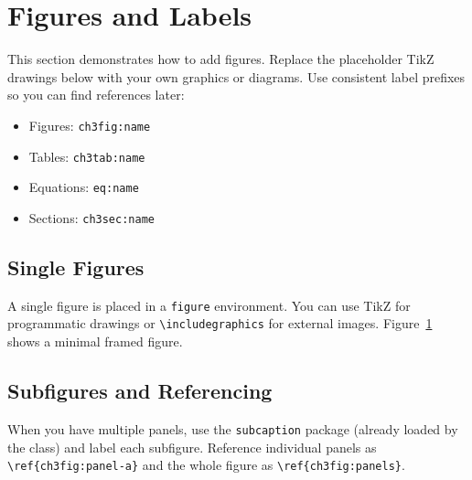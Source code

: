 \section{Figures and Labels}\label{ch3sec:figures}

This section demonstrates how to add figures. Replace the placeholder TikZ drawings below with your own graphics or diagrams. Use consistent label prefixes so you can find references later:

\begin{itemize}
\item Figures: \verb|ch3fig:name|
\item Tables: \verb|ch3tab:name|
\item Equations: \verb|eq:name|
\item Sections: \verb|ch3sec:name|
\end{itemize}

\subsection{Single Figures}

A single figure is placed in a \texttt{figure} environment. You can use TikZ for programmatic drawings or \verb|\includegraphics| for external images. Figure~\ref{ch3fig:single} shows a minimal framed figure.

\begin{figure}[ht]
\centering
{}
\label{ch3fig:single}
\end{figure}

\subsection{Subfigures and Referencing}

When you have multiple panels, use the \texttt{subcaption} package (already loaded by the class) and label each subfigure. Reference individual panels as \verb|\ref{ch3fig:panel-a}| and the whole figure as \verb|\ref{ch3fig:panels}|.
